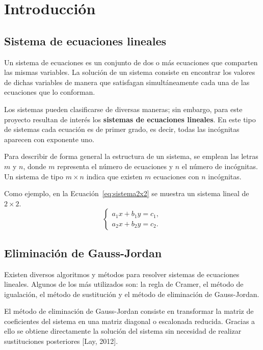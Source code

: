 \documentclass[12pt,a4paper]{article}
\begin{document}
\section{Introducción}

\subsection{Sistema de ecuaciones lineales}

Un sistema de ecuaciones es un conjunto de dos o más ecuaciones que comparten las mismas variables. La solución de un sistema consiste en encontrar los valores de dichas variables de manera que satisfagan simultáneamente cada una de las ecuaciones que lo conforman.

Los sistemas pueden clasificarse de diversas maneras; sin embargo, para este proyecto resultan de interés los \textbf{sistemas de ecuaciones lineales}. En este tipo de sistemas cada ecuación es de primer grado, es decir, todas las incógnitas aparecen con exponente uno.

Para describir de forma general la estructura de un sistema, se emplean las letras $m$ y $n$, donde $m$ representa el número de ecuaciones y $n$ el número de incógnitas. Un sistema de tipo $m \times n$ indica que existen $m$ ecuaciones con $n$ incógnitas.

Como ejemplo, en la Ecuación~\ref{eq:sistema2x2} se muestra un sistema lineal de $2 \times 2$.
\begin{equation}
\begin{cases}
a_1 x + b_1 y = c_1, \\
a_2 x + b_2 y = c_2.
\end{cases}
\label{eq:sistema2x2}
\end{equation}

\subsection{Eliminación de Gauss-Jordan}

Existen diversos algoritmos y métodos para resolver sistemas de ecuaciones lineales. Algunos de los más utilizados son: la regla de Cramer, el método de igualación, el método de sustitución y el método de eliminación de Gauss-Jordan.

El método de eliminación de Gauss-Jordan consiste en transformar la matriz de coeficientes del sistema en una matriz diagonal o escalonada reducida. Gracias a ello se obtiene directamente la solución del sistema sin necesidad de realizar sustituciones posteriores [Lay, 2012].
\end{document}
